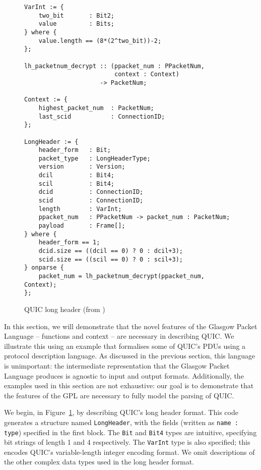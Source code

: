 \documentclass[10pt,sigconf]{acmart}
\begin{document}
\begin{figure}
	\vspace{3mm}
    \begin{BVerbatim}[fontsize=\scriptsize]
VarInt := {
	two_bit       : Bit2;
	value         : Bits;
} where {
	value.length == (8*(2^two_bit))-2;
};

lh_packetnum_decrypt :: (ppacket_num : PPacketNum, 
                         context : Context) 
                     -> PacketNum;
                     
Context := {
	highest_packet_num  : PacketNum;
	last_scid           : ConnectionID;
};

LongHeader := {
	header_form   : Bit;
	packet_type   : LongHeaderType;
	version       : Version;
	dcil          : Bit4;
	scil          : Bit4;
	dcid          : ConnectionID;
	scid          : ConnectionID;
	length        : VarInt;
	ppacket_num   : PPacketNum -> packet_num : PacketNum;
	payload       : Frame[];
} where {
	header_form == 1;
	dcid.size == ((dcil == 0) ? 0 : dcil+3);
	scid.size == ((scil == 0) ? 0 : scil+3);
} onparse {
	packet_num = lh_packetnum_decrypt(ppacket_num, Context);
};
    \end{BVerbatim}
    \caption{QUIC long header (from \cite{draft-ietf-quic-transport-latest})}
    \label{fig:quic-long-hdr-desc}
\end{figure}

In this section, we will demonstrate that the novel features of the Glasgow Packet
Language -- functions and context -- are necessary in describing QUIC. We illustrate this
using an example that formalises some of QUIC's PDUs using a protocol description
language. As discussed in the previous section, this language is unimportant: the
intermediate representation that the Glasgow Packet Language produces is agnostic to
input and output formats. Additionally, the examples used in this section are not
exhaustive: our goal is to demonstrate that the features of the GPL are necessary to
fully model the parsing of QUIC.

We begin, in Figure~\ref{fig:quic-long-hdr-desc}, by describing QUIC's long header
format. This code generates a structure named \texttt{LongHeader}, with the fields
(written as \texttt{name : type}) specified in the first block. The \texttt{Bit} and 
\texttt{Bit4} types are intuitive, specifying bit strings of length 1 and 4 respectively.
The \texttt{VarInt} type is also specified; this encodes QUIC's variable-length integer
encoding format. We omit descriptions of the other complex data types used in the
long header format.
\end{document}
